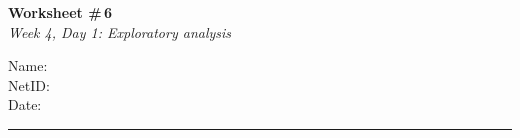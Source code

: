 \documentclass[11pt]{article}
\begin{document}
\noindent
\begin{minipage}[t]{0.55\textwidth}
  \vspace{0pt}
  {\LARGE \textbf{Worksheet \#\,6}} \\[0.3em]
  {\large \textit{Week 4, Day 1: Exploratory analysis}}
\end{minipage}
\hfill
\begin{minipage}[t]{0.40\textwidth}
  \vspace{0pt}
  \begin{mdframed}[linecolor=black, linewidth=1pt, innertopmargin=10pt, innerbottommargin=10pt]
    \small
    \vspace{0.4cm}
    Name: \underline{\hspace{4.5cm}} \\[1em]
    NetID: \underline{\hspace{4.3cm}} \\[1em]
    Date: \underline{\hspace{4.4cm}} \\
  \end{mdframed}
\end{minipage}

\vspace{1em}
\noindent\rule{\linewidth}{1pt}
\vspace{0.2em}
\end{document}
